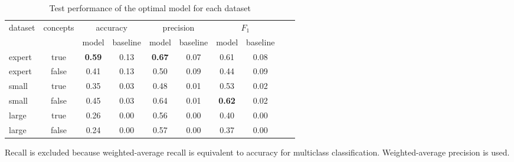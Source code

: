 \begin{table*}[h]
\centering
\begin{threeparttable}
\caption{Test performance of the optimal model for each dataset}
\label{table:phase2-results-b}
\begin{tabular}{lccccccccc}
\toprule
\multirow{2}{*}{dataset} & \multirow{2}{*}{concepts} & \multicolumn{2}{c}{accuracy} & \multicolumn{2}{c}{precision} & \multicolumn{2}{c}{$F_1$} \\
 &  & model & baseline & model & baseline & model & baseline \\
\midrule
expert & true & \textbf{0.59} & 0.13 & \textbf{0.67} & 0.07 & 0.61 & 0.08 \\
expert & false & 0.41 & 0.13 & 0.50 & 0.09 & 0.44 & 0.09 \\
small & true & 0.35 & 0.03 & 0.48 & 0.01 & 0.53 & 0.02 \\
small & false & 0.45 & 0.03 & 0.64 & 0.01 & \textbf{0.62} & 0.02 \\
large & true & 0.26 & 0.00 & 0.56 & 0.00 & 0.40 & 0.00 \\
large & false & 0.24 & 0.00 & 0.57 & 0.00 & 0.37 & 0.00 \\
\bottomrule
\end{tabular}
\begin{tablenotes} \footnotesize\centering
\nonumitem Recall is excluded because weighted-average recall is equivalent to accuracy for multiclass classification. Weighted-average precision is used.
\end{tablenotes}
\end{threeparttable}
\end{table*}



